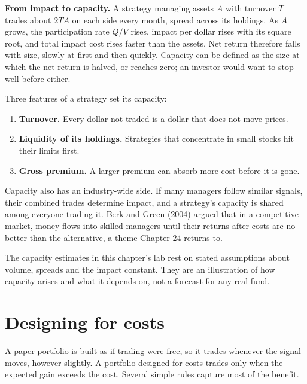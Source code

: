 \textbf{From impact to capacity.} A strategy managing assets $A$ with turnover $T$ trades about $2TA$ on each side every month, spread across its holdings. As $A$ grows, the participation rate $Q/V$ rises, impact per dollar rises with its square root, and total impact cost rises faster than the assets. Net return therefore falls with size, slowly at first and then quickly. Capacity can be defined as the size at which the net return is halved, or reaches zero; an investor would want to stop well before either.

Three features of a strategy set its capacity:

\begin{enumerate}
  \item \textbf{Turnover.} Every dollar not traded is a dollar that does not move prices.
  \item \textbf{Liquidity of its holdings.} Strategies that concentrate in small stocks hit their limits first.
  \item \textbf{Gross premium.} A larger premium can absorb more cost before it is gone.
\end{enumerate}

Capacity also has an industry-wide side. If many managers follow similar signals, their combined trades determine impact, and a strategy's capacity is shared among everyone trading it. Berk and Green (2004) argued that in a competitive market, money flows into skilled managers until their returns after costs are no better than the alternative, a theme Chapter 24 returns to.

The capacity estimates in this chapter's lab rest on stated assumptions about volume, spreads and the impact constant. They are an illustration of how capacity arises and what it depends on, not a forecast for any real fund.

\section{Designing for costs}
\label{sec:06-design}

A paper portfolio is built as if trading were free, so it trades whenever the signal moves, however slightly. A portfolio designed for costs trades only when the expected gain exceeds the cost. Several simple rules capture most of the benefit.

